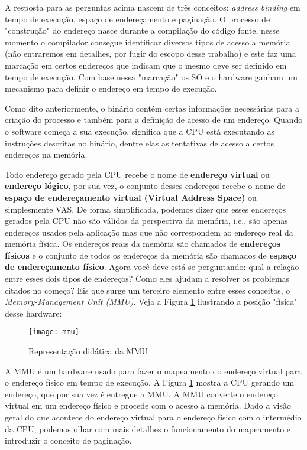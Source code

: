 A resposta para as perguntas acima nascem de três conceitos: \textit{address
binding} em tempo de execução, espaço de endereçamento e paginação. O processo
de "construção" do endereço nasce durante a compilação do código fonte, nesse
momento o compilador consegue identificar diversos tipos de acesso a memória
(não entraremos em detalhes, por fugir do escopo desse trabalho) e este faz uma
marcação em certos endereços que indicam que o mesmo deve ser definido em tempo
de execução. Com base nessa "marcação" os SO e o hardware ganham um mecanismo
para definir o endereço em tempo de execução.

Como dito anteriormente, o binário contém certas informações necessárias para a
criação do processo e também para a definição de acesso de um endereço. Quando
o software começa a sua execução, significa que a CPU está executando as
instruções descritas no binário, dentre elas as tentativas de acesso a certos
endereços na memória.

Todo endereço gerado pela CPU recebe o nome de \textbf{endereço virtual} ou
\textbf{endereço lógico}, por sua vez, o conjunto desses
endereços recebe o nome de \textbf{espaço de endereçamento virtual (Virtual
Address Space)} ou simplesmente VAS. De forma simplificada, podemos dizer que
esses endereços gerados pela CPU não são válidos da perspectiva da memória,
i.e., são apenas endereços usados pela aplicação mas que não correspondem ao
endereço real da memória física. Os endereços reais da memória são chamados de
\textbf{endereços físicos} e o conjunto de todos os endereços da memória são
chamados de \textbf{espaço de endereçamento físico}. Agora você deve está se
perguntando: qual a relação entre esses dois tipos de endereços? Como eles
ajudam a resolver os problemas citados no começo? Eis que surge um terceiro
elemento entre esses conceitos, o \textit{Memory-Management Unit
(MMU)}. Veja a Figura \ref{fig:mmu} ilustrando a posição "física"
desse hardware:

\begin{figure}[!h]
  \centering
  \texttt{[image: mmu]} 
  \caption{Representação didática da MMU}
  \label{fig:mmu}
\end{figure}

A MMU é um hardware usado para fazer o mapeamento do endereço virtual para o
endereço físico em tempo de execução. A Figura \ref{fig:mmu} mostra a CPU
gerando um endereço, que por sua vez é entregue a MMU. A MMU converte o
endereço virtual em um endereço físico e procede com o acesso a memória. Dado a
visão geral do que acontece do endereço virtual para o endereço físico com o
intermédio da CPU, podemos olhar com mais detalhes o funcionamento do
mapeamento e introduzir o conceito de paginação.

